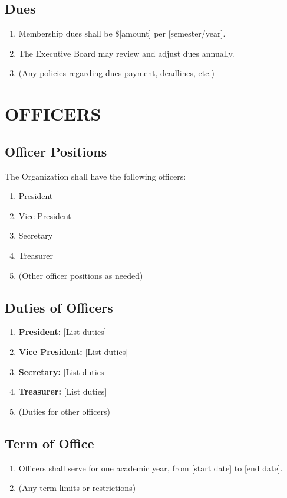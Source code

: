 \documentclass[12pt,letterpaper]{article}
\begin{document}
\subsection{Dues}
\begin{enumerate}[label=\alph*., leftmargin=2em]
    \item Membership dues shall be \$[amount] per [semester/year].
    \item The Executive Board may review and adjust dues annually.
    \item (Any policies regarding dues payment, deadlines, etc.)
\end{enumerate}

\section{OFFICERS}

\subsection{Officer Positions}
The Organization shall have the following officers:
\begin{enumerate}[label=\alph*., leftmargin=2em]
    \item President
    \item Vice President
    \item Secretary
    \item Treasurer
    \item (Other officer positions as needed)
\end{enumerate}

\subsection{Duties of Officers}
\begin{enumerate}[label=\alph*., leftmargin=2em]
    \item \textbf{President:} [List duties]
    \item \textbf{Vice President:} [List duties]
    \item \textbf{Secretary:} [List duties]
    \item \textbf{Treasurer:} [List duties]
    \item (Duties for other officers)
\end{enumerate}

\subsection{Term of Office}
\begin{enumerate}[label=\alph*., leftmargin=2em]
    \item Officers shall serve for one academic year, from [start date] to [end date].
    \item (Any term limits or restrictions)
\end{enumerate}
\end{document}
